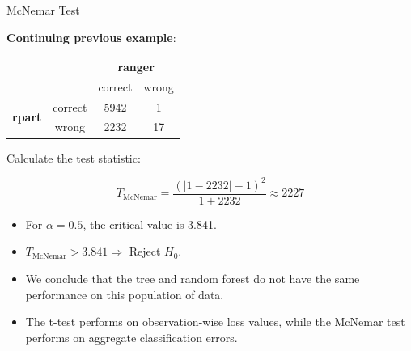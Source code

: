 \documentclass[11pt,compress,t,notes=noshow, xcolor=table]{beamer}
\begin{document}





\begin{frame}{McNemar Test}

\textbf{Continuing previous example}:

\begin{center}
  \begin{tabular}{cc|cc}
      & & \multicolumn{2}{c}{\textbf{ranger}} \\
      & & correct & wrong \\
      \hline
      \multirow{2}{*}{\textbf{rpart}} & correct & 5942 & 1 \\
      & wrong & 2232 & 17 \\
  \end{tabular}
\end{center}

Calculate the test statistic:

$$T_{\text{McNemar}} =  \frac{(|1 - 2232| - 1)^2}{1 + 2232} \approx 2227
$$
\begin{itemize}
    \item For $\alpha = 0.5$, the critical value is 3.841.
    \item $T_{\text{McNemar}} > 3.841 \Rightarrow$ Reject $H_0$.
    \item We conclude that the tree and random forest do not have the same performance on this population of data.
    \item The t-test performs on observation-wise loss values, while the McNemar test performs on aggregate classification errors.
\end{itemize}

\end{frame}
\end{document}
